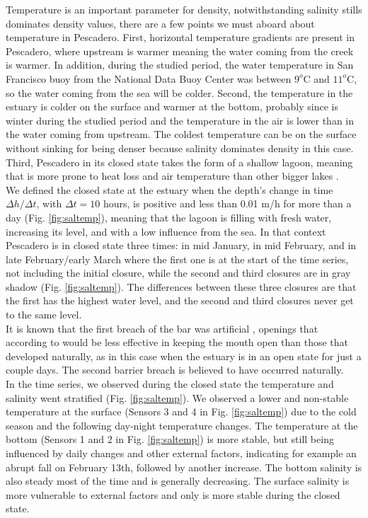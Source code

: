 \documentclass[tesis.tex]{subfiles}
\begin{document}
Temperature is an important parameter for density, notwithstanding salinity stills dominates density values, there are a few points we must aboard about temperature in Pescadero. First, horizontal temperature gradients are present in Pescadero, where upstream is warmer meaning the water coming from the creek is warmer. In addition, during the studied period, the water temperature in San Francisco buoy from the National Data Buoy Center was between $9^o$C and $11^o$C, so the water coming from the sea will be colder. Second, the temperature in the estuary is colder on the surface and warmer at the bottom, probably since is winter during the studied period and the temperature in the air is lower than in the water coming from upstream. The coldest temperature can be on the surface without sinking for being denser because salinity dominates density in this case. Third, Pescadero in its closed state takes the form of a shallow lagoon, meaning that is more prone to heat loss and air temperature than other bigger lakes \citep{peeters2009currents}.\\

We defined the closed state at the estuary when the depth's change in time $\Delta h/\Delta t$, with $\Delta t=10$ hours, is positive and less than 0.01 m/h for more than a day (Fig. \ref{fig:saltemp}), meaning that the lagoon is filling with fresh water, increasing its level, and with a low influence from the sea. In that context Pescadero is in closed state three times: in mid January, in mid February, and in late February/early March where the first one is at the start of the time series, not including the initial closure, while the second and third closures are in gray shadow (Fig. \ref{fig:saltemp}). The differences between these three closures are that the first has the highest water level, and the second and third closures never get to the same level. \\

It is known that the first breach of the bar was artificial \citep{Williams2014}, openings that according to \cite{Behrens2013} would be less effective in keeping the mouth open than those that developed naturally, as in this case when the estuary is in an open state for just a couple days. The second barrier breach is believed to have occurred naturally. \\

In the time series, we observed during the closed state the temperature and salinity went stratified (Fig. \ref{fig:saltemp}). We observed a lower and non-stable temperature at the surface (Sensors 3 and 4 in Fig. \ref{fig:saltemp}) due to the cold season and the following day-night temperature changes. The temperature at the bottom (Sensors 1 and 2 in Fig. \ref{fig:saltemp}) is more stable, but still being influenced by daily changes and other external factors, indicating for example an abrupt fall on February 13th, followed by another increase. The bottom salinity is also steady most of the time and is generally decreasing. The surface salinity is more vulnerable to external factors and only is more stable during the closed state. \\ 
\end{document}

